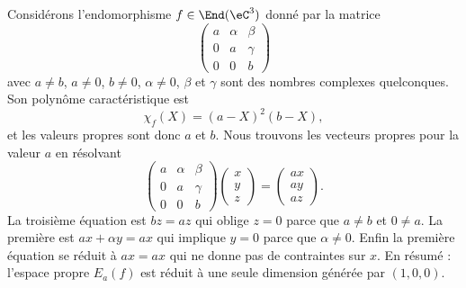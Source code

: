 \begin{remark}  \label{RemBOGooCLMwyb}
	Considérons l'endomorphisme \( f\in\End(\eC^3)\) donné par la matrice
	\begin{equation}
		\begin{pmatrix}
			a & \alpha & \beta  \\
			0 & a      & \gamma \\
			0 & 0      & b
		\end{pmatrix}
	\end{equation}
	avec \( a\neq b\), \( a\neq 0\), \( b\neq 0\), \( \alpha\neq 0\), \( \beta\) et \( \gamma\) sont des nombres complexes quelconques.
	Son polynôme caractéristique est
	\begin{equation}
		\chi_f(X)=(a-X)^2(b-X),
	\end{equation}
	et les valeurs propres sont donc \( a\) et \( b\). Nous trouvons les vecteurs propres pour la valeur \( a\) en résolvant
	\begin{equation}
		\begin{pmatrix}
			a & \alpha & \beta  \\
			0 & a      & \gamma \\
			0 & 0      & b
		\end{pmatrix}\begin{pmatrix}
			x \\
			y \\
			z
		\end{pmatrix}=\begin{pmatrix}
			ax \\
			ay \\
			az
		\end{pmatrix}.
	\end{equation}
	La troisième équation est \( bz=az\) qui oblige \( z=0\) parce que \( a\neq b\) et \( 0\neq a\). La première est \( ax+\alpha y=ax\) qui implique \( y=0\) parce que \( \alpha\neq 0\). Enfin la première équation se réduit à \( ax=ax\) qui ne donne pas de contraintes sur \( x\). En résumé : l'espace propre \( E_a(f)\) est réduit à une seule dimension générée par \( (1,0,0)\).


\end{remark}
